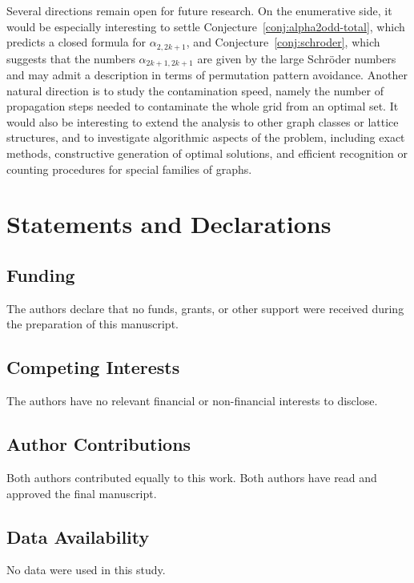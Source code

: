 \documentclass[letterpaper,12pt]{article}
\begin{document}
Several directions remain open for future research. On the enumerative side, it would be especially interesting to settle Conjecture~\ref{conj:alpha2odd-total}, which predicts a closed formula for \(\alpha_{2,2k+1}\), and Conjecture~\ref{conj:schroder}, which suggests that the numbers \(\alpha_{2k+1,2k+1}\) are given by the large Schr\"oder numbers and may admit a description in terms of permutation pattern avoidance.   Another natural direction is to study the contamination speed, namely the number of propagation steps needed to contaminate the whole grid from an optimal set. It would also be interesting to extend the analysis to other graph classes or lattice structures, and to investigate algorithmic aspects of the problem, including exact methods, constructive generation of optimal solutions, and efficient recognition or counting procedures for special families of graphs.



 \section*{Statements and Declarations}

\subsection*{Funding}
The authors declare that no funds, grants, or other support were received during the preparation of this manuscript.

\subsection*{Competing Interests}
The authors have no relevant financial or non-financial interests to disclose.

\subsection*{Author Contributions}

Both authors contributed equally to this work. Both authors have read and approved the final manuscript.

\subsection*{Data Availability}
No data were used in this study.

 

\end{document}
